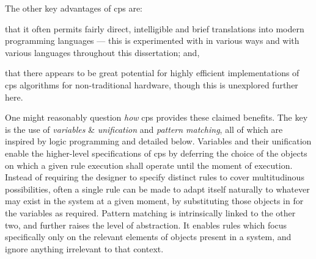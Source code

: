 The other key advantages of \gls{cps} are:
\begin{inparaenum}[a)]
\item that it often permits fairly direct, intelligible and brief translations into modern programming languages --- this is experimented with in various ways and with various languages throughout this dissertation; and,
\item that there appears to be great potential for highly efficient implementations of \gls{cps} algorithms for non-traditional hardware, though this is unexplored further here.
\end{inparaenum}

One might reasonably question \emph{how} \gls{cps} provides these claimed benefits.  The key is the use of \emph{variables} \& \emph{unification} and \emph{pattern matching}, all of which are inspired by logic programming and detailed below.  Variables and their unification enable the higher-level specifications of \gls{cps} by deferring the choice of the objects on which a given rule execution shall operate until the moment of execution.  Instead of requiring the designer to specify distinct rules to cover multitudinous possibilities, often a single rule can be made to adapt itself naturally to whatever may exist in the system at a given moment, by substituting those objects in for the variables as required.  Pattern matching is intrinsically linked to the other two, and further raises the level of abstraction.  It enables rules which focus specifically only on the relevant elements of objects present in a system, and ignore anything irrelevant to that context.













